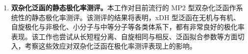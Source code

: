 \begin{enumerate}[nosep]
  \item \textbf{双杂化泛函的静态极化率测评。}本工作对目前流行的 MP2 型双杂化泛函作系统性的静态极化率测评。该测评的结果将表明，xDH 型泛函在无机与有机、自旋极化与非极化、小分子与中等分子等各类体系下，都有非常良好的极化率表现。该工作也尝试从长短程分离、自旋相同与相反、泛函拟合参数等方面切入，考察这些效应对双杂化泛函在极化率测评表现上的影响。
  
\end{enumerate}

\newpage

